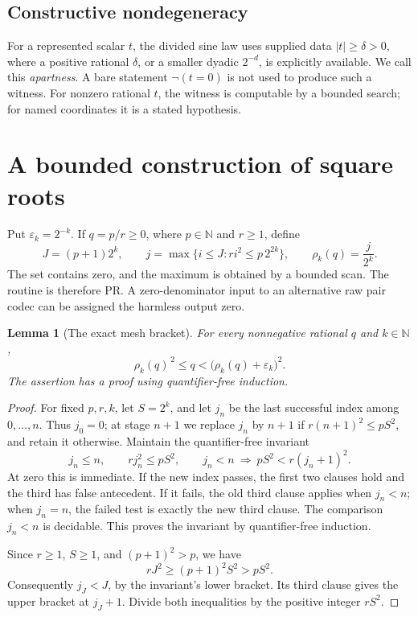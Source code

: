 \documentclass[11pt,a4paper]{article}
\newtheorem{lemma}[theorem]{Lemma}
\theoremstyle{definition}
\newcommand{\N}{\mathbb N}
\newcommand{\eps}{\varepsilon}
\newcommand{\abs}[1]{\left|#1\right|}
\newcommand{\rhoq}[2]{\rho_{#1}\!\left(#2\right)}
\numberwithin{equation}{section}
\begin{document}
\subsection{Constructive nondegeneracy}

For a represented scalar \(t\), the divided sine law uses supplied data
\(\abs t\ge\delta>0\), where a positive rational \(\delta\), or a smaller
dyadic \(2^{-d}\), is explicitly available. We call this
\emph{apartness}. A bare statement \(\neg(t=0)\) is not used to produce
such a witness. For nonzero rational \(t\), the witness is computable by
a bounded search; for named coordinates it is a stated hypothesis.

\section{A bounded construction of square roots}\label{sec:root}

Put \(\eps_k=2^{-k}\). If \(q=p/r\ge0\), where \(p\in\N\) and
\(r\ge1\), define
\[
 J=(p+1)2^k,\qquad
 j=\max\{i\le J:r i^2\le p\,2^{2k}\},\qquad
 \rhoq{k}{q}=\frac{j}{2^k}.
 \tag{2.1}\label{eq:root-program}
\]
The set contains zero, and the maximum is obtained by a bounded scan.
The routine is therefore PR. A zero-denominator input to an alternative
raw pair codec can be assigned the harmless output zero.

\begin{lemma}[The exact mesh bracket]\label{lem:mesh}
For every nonnegative rational \(q\) and \(k\in\N\),
\[
 \rhoq{k}{q}^{\,2}\le q
 <\bigl(\rhoq{k}{q}+\eps_k\bigr)^2.
 \tag{2.2}\label{eq:mesh}
\]
The assertion has a proof using quantifier-free induction.
\end{lemma}

\begin{proof}
For fixed \(p,r,k\), let \(S=2^k\), and let \(j_n\) be the last
successful index among \(0,\ldots,n\). Thus \(j_0=0\); at stage \(n+1\)
we replace \(j_n\) by \(n+1\) if \(r(n+1)^2\le pS^2\), and retain it
otherwise. Maintain the quantifier-free invariant
\[
 j_n\le n,\qquad rj_n^2\le pS^2,\qquad
 j_n<n\ \Longrightarrow\ pS^2<r(j_n+1)^2.
 \tag{2.3}\label{eq:scan-invariant}
\]
At zero this is immediate. If the new index passes, the first two
clauses hold and the third has false antecedent. If it fails, the old
third clause applies when \(j_n<n\); when \(j_n=n\), the failed test is
exactly the new third clause. The comparison \(j_n<n\) is decidable.
This proves the invariant by quantifier-free induction.

Since \(r\ge1\), \(S\ge1\), and \((p+1)^2>p\), we have
\[
 rJ^2\ge(p+1)^2S^2>pS^2.
\]
Consequently \(j_J<J\), by the invariant's lower bracket. Its third
clause gives the upper bracket at \(j_J+1\). Divide both inequalities
by the positive integer \(rS^2\).
\end{proof}
\end{document}
